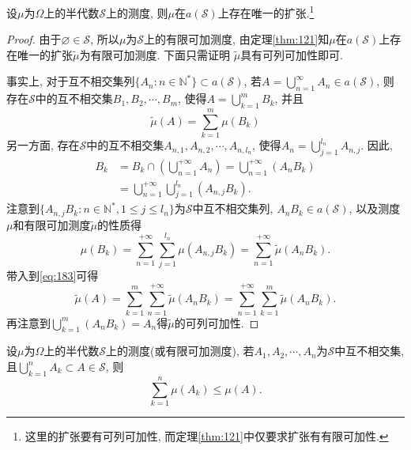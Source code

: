\begin{theorem}
	设$\mu$为$\Omega$上的半代数$\mathscr{S}$上的测度, 则$\mu$在$a(\mathscr{S})$上存在唯一的扩张.\footnote{这里的扩张要有可列可加性, 而定理\ref{thm:121}中仅要求扩张有有限可加性.}
\end{theorem}

\begin{proof}
	由于$\varnothing\in\mathscr{S}$, 所以$\mu$为$\mathscr{S}$上的有限可加测度, 由定理\ref{thm:121}知$\mu$在$a(\mathscr{S})$上存在唯一的扩张$\tilde{\mu}$为有限可加测度. 下面只需证明
	$\tilde{\mu}$具有可列可加性即可.

	事实上, 对于互不相交集列$\{A_n:n\in\mathbb{N}^*\}\subset a(\mathscr{S})$, 若$A = \bigcup_{n=1}^{\infty}A_n\in a(\mathscr{S})$,
	则存在$\mathscr{S}$中的互不相交集$B_1,B_2,\cdots,B_m$, 使得$A = \bigcup_{k=1}^m B_k$, 并且\begin{equation}
		\label{eq:183}\tilde{\mu}(A) = \sum_{k=1}^m \mu(B_k)
	\end{equation}
	另一方面, 存在$\mathscr{S}$中的互不相交集$A_{n,1},A_{n,2},\cdots,A_{n,l_n}$, 使得$A_n = \bigcup_{j=1}^{l_n}A_{n,j}$. 因此,
	\begin{align}
		B_k &= B_k\cap \left( \bigcup_{n=1}^{+\infty}A_n \right) = \bigcup_{n=1}^{+\infty}(A_nB_k)\nonumber\\
		&= \bigcup_{n=1}^{+\infty}\bigcup_{j=1}^{l_n}(A_{n,j}B_k).
	\end{align}
	注意到$\{ A_{n,j}B_k:n\in\mathbb{N}^*,1\leqslant j\leqslant l_n \}$为$\mathscr{S}$中互不相交集列, $A_nB_k\in a(\mathscr{S})$, 以及测度$\mu$和有限可加测度$\tilde{\mu}$的性质得
	\begin{equation}
		\mu(B_k) = \sum_{n=1}^{+\infty}\sum_{j=1}^{l_n}\mu(A_{n,j}B_k) = \sum_{n=1}^{+\infty}\tilde{\mu}(A_nB_k).
	\end{equation}
	带入到\ref{eq:183}可得\begin{equation}
		\tilde{\mu}(A) = \sum_{k=1}^m\sum_{n=1}^{+\infty}\tilde{\mu}(A_nB_k) = \sum_{n=1}^{+\infty}\sum_{k=1}^m\tilde{\mu}(A_nB_k).
	\end{equation}
	再注意到$\bigcup_{k=1}^m(A_nB_k) = A_n$得$\tilde{\mu}$的可列可加性.
\end{proof}

\begin{theorem}[测度的单调性]
	设$\mu$为$\Omega$上的半代数$\mathscr{S}$上的测度(或有限可加测度), 若$A_1,A_2,\cdots,A_n$为$\mathscr{S}$中互不相交集,
	且$\bigcup_{k=1}^n A_k\subset A\in\mathscr{S}$, 则\label{thm:measurepropmonotone}
	\begin{equation}
		\sum_{k=1}^n\mu(A_k)\leqslant \mu(A).\label{eq:117}
	\end{equation}
\end{theorem}

